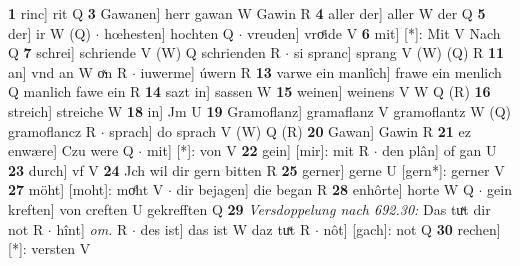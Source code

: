 \documentclass[8pt,a4paper,notitlepage]{article}
\begin{document}
\begin{table}[ht]
\begin{minipage}[t]{0.5\linewidth}
\textbf{1} rinc] rit Q \textbf{3} Gawanen] herr gawan W Gawin R \textbf{4} aller der] aller W der Q \textbf{5} der] ir W (Q)  $\cdot$ hœhesten] hochten Q  $\cdot$ vreuden] vroͤide V \textbf{6} mit] [*]: Mit V Nach Q \textbf{7} schrei] schriende V (W) Q schrienden R  $\cdot$ si spranc] sprang V (W) (Q) R \textbf{11} an] vnd an W oͯn R  $\cdot$ iuwerme] úwern R \textbf{13} varwe ein manlîch] frawe ein menlich Q manlich fawe ein R \textbf{14} sazt in] sassen W \textbf{15} weinen] weinens V W Q (R) \textbf{16} streich] streiche W \textbf{18} in] Jm U \textbf{19} Gramoflanz] gramaflanz V gramoflantz W (Q) gramoflancz R  $\cdot$ sprach] do sprach V (W) Q (R) \textbf{20} Gawan] Gawin R \textbf{21} ez enwære] Czu were Q  $\cdot$ mit] [*]: von V \textbf{22} gein] [mir]: mit R  $\cdot$ den plân] of gan U \textbf{23} durch] vf V \textbf{24} Jch wil dir gern bitten R \textbf{25} gerner] gerne U [gern*]: gerner V \textbf{27} möht] [moht]: moͤht V  $\cdot$ dir bejagen] die began R \textbf{28} enhôrte] horte W Q  $\cdot$ gein kreften] von creften U gekrefften Q \textbf{29} \textit{Versdoppelung nach 692.30:} Das tuͯt dir not R   $\cdot$ hînt] \textit{om.} R  $\cdot$ des ist] das ist W daz tuͯt R  $\cdot$ nôt] [gach]: not Q \textbf{30} rechen] [*]: versten V \newline
\end{minipage}
\end{table}
\end{document}

